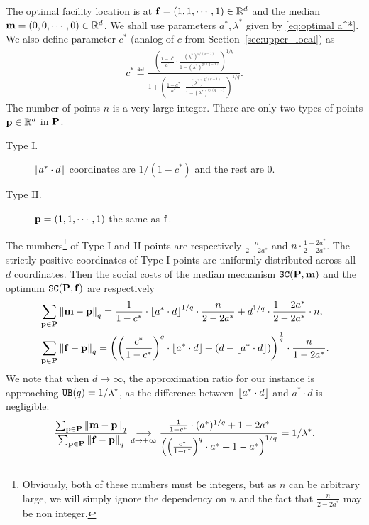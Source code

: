 The optimal facility location is at $\mathbf{f}=(1,1,\cdots,1)\in{\mathbb R}^d$ and the median $\mathbf{m}=(0,0,\cdots,0)\in{\mathbb R}^d$. We shall use parameters $a^*,\lambda^*$ given by \eqref{eq:optimal a^*}. We also define parameter $c^*$ (analog of $c$ from Section~\ref{sec:upper_local}) as
\begin{align*}
        c^*\eqdef\frac{\left(\frac{1-a^*}{a^*}\cdot\frac{(\lambda^*)^{q/(q-1)}}{1-(\lambda^*)^{q/(q-1)}}\right)^{1/q}}{1+\left(\frac{1-a^*}{a^*}\cdot\frac{(\lambda^*)^{q/(q-1)}}{1-(\lambda^*)^{q/(q-1)}}\right)^{1/q}}.
\end{align*}        
The number of points $n$ is a very large integer. There are only two types of points $\mathbf{p}\in{\mathbb R}^d$ in $\mathbf{P}$.
\begin{description}
        \item[Type I.] $\left\lfloor a^*\cdot d\right\rfloor$ coordinates are $1/(1-c^*)$ and the rest are $0$.        
        \item[Type II.] $\mathbf{p}=(1,1,\cdots,1)$ the same as $\mathbf{f}$.
\end{description}
The numbers\footnote{Obviously, both of these numbers must be integers, but as $n$ can be arbitrary large, we will simply ignore the dependency on $n$ and the fact that $\frac{n}{2-2a^*}$ may be non integer.} of Type I and II points are respectively $\frac{n}{2-2a^*}$ and $n\cdot\frac{1-2a^*}{2-2a^*}$. 
The strictly positive coordinates of Type I points are uniformly distributed across all $d$ coordinates.
Then the social costs of the median mechanism $\texttt{SC}(\mathbf{P},\mathbf{m})$ and the optimum $\texttt{SC}(\mathbf{P},\mathbf{f})$ are respectively
\begin{align*}
    &\sum_{\mathbf{p}\in\mathbf{P}} \left\Vert \mathbf{m}-\mathbf{p}\right\Vert_{q}=\frac{1}{1-c^*}\cdot\left\lfloor a^*\cdot d\right\rfloor^{1/q}\cdot\frac{n}{2-2a^*}+d^{1/q}\cdot\frac{1-2a^*}{2-2a^*}\cdot n,\\
    &\sum_{\mathbf{p}\in\mathbf{P}} \left\Vert \mathbf{f}-\mathbf{p}\right\Vert_{q}=\left(\left(\frac{c^*}{1-c^*}\right)^q\cdot \left\lfloor a^*\cdot d\right\rfloor+(d-\left\lfloor a^*\cdot d\right\rfloor)\right)^\frac{1}{q}\cdot\frac{n}{1-2a^*}.
\end{align*}
We note that when $d\rightarrow\infty$, the approximation ratio for our instance is approaching $\texttt{UB}(q)=1/\lambda^*$, as the difference between $\left\lfloor a^*\cdot d\right\rfloor$ and $a^*\cdot d$ is negligible: 
\begin{align*}
    \frac{\sum_{\mathbf{p}\in\mathbf{P}} \left\Vert \mathbf{m}-\mathbf{p}\right\Vert_{q}}{\sum_{\mathbf{p}\in\mathbf{P}} \left\Vert \mathbf{f}-\mathbf{p}\right\Vert_{q}}
    \underset{d\to+\infty}{\longrightarrow}
    \frac{\frac{1}{1-c^*}\cdot (a^*)^{1/q}+1-2a^*}{\left(\left(\frac{c^*}{1-c^*}\right)^q\cdot a^* +1-a^*\right)^{1/q}}=1/\lambda^*.
\end{align*}
